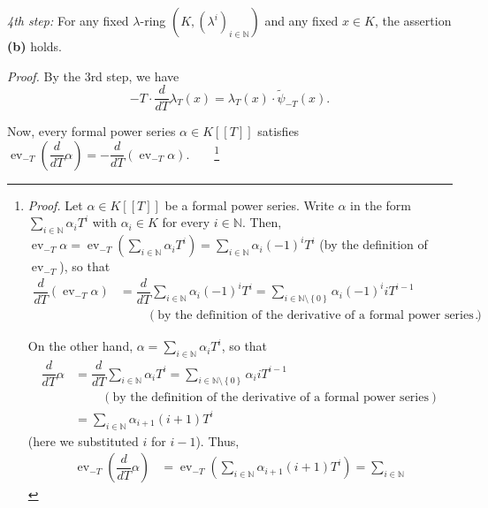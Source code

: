 \documentclass[numbers=enddot,12pt,final,onecolumn,notitlepage]{scrartcl}%
\begin{document}
\textit{4th step:} For any fixed $\lambda$-ring $\left(  K,\left(  \lambda
^{i}\right)  _{i\in\mathbb{N}}\right)  $ and any fixed $x\in K$, the assertion
\textbf{(b)} holds.

\textit{Proof.} By the 3rd step, we have
\[
-T\cdot\dfrac{d}{dT}\lambda_{T}\left(  x\right)  =\lambda_{T}\left(  x\right)
\cdot\widetilde{\psi}_{-T}\left(  x\right)  .
\]


Now, every formal power series $\alpha\in K\left[  \left[  T\right]  \right]
$ satisfies $\operatorname*{ev}\nolimits_{-T}\left(  \dfrac{d}{dT}%
\alpha\right)  =-\dfrac{d}{dT}\left(  \operatorname*{ev}\nolimits_{-T}%
\alpha\right)  $.\ \ \ \ \footnote{\textit{Proof.} Let $\alpha\in K\left[
\left[  T\right]  \right]  $ be a formal power series. Write $\alpha$ in the
form $\sum\limits_{i\in\mathbb{N}}\alpha_{i}T^{i}$ with $\alpha_{i}\in K$ for
every $i\in\mathbb{N}$. Then, $\operatorname*{ev}\nolimits_{-T}\alpha
=\operatorname*{ev}\nolimits_{-T}\left(  \sum\limits_{i\in\mathbb{N}}%
\alpha_{i}T^{i}\right)  =\sum\limits_{i\in\mathbb{N}}\alpha_{i}\left(
-1\right)  ^{i}T^{i}$ (by the definition of $\operatorname*{ev}\nolimits_{-T}%
$), so that%
\begin{align*}
\dfrac{d}{dT}\left(  \operatorname*{ev}\nolimits_{-T}\alpha\right)   &
=\dfrac{d}{dT}\sum\limits_{i\in\mathbb{N}}\alpha_{i}\left(  -1\right)
^{i}T^{i}=\sum\limits_{i\in\mathbb{N}\setminus\left\{  0\right\}  }\alpha
_{i}\left(  -1\right)  ^{i}iT^{i-1}\\
&  \ \ \ \ \ \ \ \ \ \ \left(  \text{by the definition of the derivative of a
formal power series}\right)  .
\end{align*}
\par
On the other hand, $\alpha=\sum\limits_{i\in\mathbb{N}}\alpha_{i}T^{i}$, so
that%
\begin{align*}
\dfrac{d}{dT}\alpha &  =\dfrac{d}{dT}\sum\limits_{i\in\mathbb{N}}\alpha
_{i}T^{i}=\sum\limits_{i\in\mathbb{N}\setminus\left\{  0\right\}  }\alpha
_{i}iT^{i-1}\\
&  \ \ \ \ \ \ \ \ \ \ \left(  \text{by the definition of the derivative of a
formal power series}\right) \\
&  =\sum\limits_{i\in\mathbb{N}}\alpha_{i+1}\left(  i+1\right)  T^{i}%
\end{align*}
(here we substituted $i$ for $i-1$). Thus,%
\begin{align*}
\operatorname*{ev}\nolimits_{-T}\left(  \dfrac{d}{dT}\alpha\right)   &
=\operatorname*{ev}\nolimits_{-T}\left(  \sum\limits_{i\in\mathbb{N}}%
\alpha_{i+1}\left(  i+1\right)  T^{i}\right)  =\sum\limits_{i\in\mathbb{N}%
}
\end{align*}}
\end{document}

